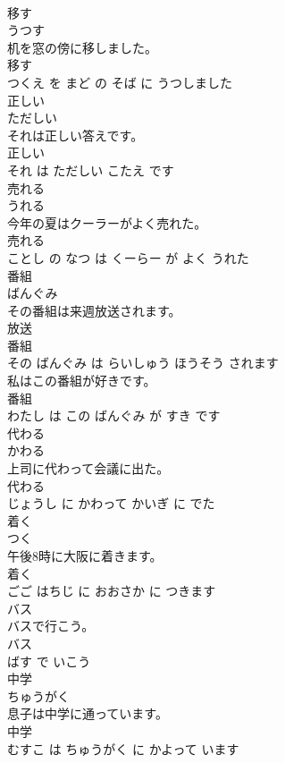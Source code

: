 \documentclass[8pt]{extreport}
\begin{document}
\begin{CJK}{UTF8}{min}
\\	移す	
\\	うつす			
\\	机を窓の傍に移しました。	
\\	移す 
\\	つくえ を まど の そば に うつしました			
\\	正しい	
\\	ただしい			
\\	それは正しい答えです。	
\\	正しい 
\\	それ は ただしい こたえ です			
\\	売れる	
\\	うれる			
\\	今年の夏はクーラーがよく売れた。	
\\	売れる 
\\	ことし の なつ は くーらー が よく うれた			
\\	番組	
\\	ばんぐみ			
\\	その番組は来週放送されます。	
\\	放送 
\\	番組 
\\	その ばんぐみ は らいしゅう ほうそう されます			
\\	私はこの番組が好きです。	
\\	番組 
\\	わたし は この ばんぐみ が すき です			
\\	代わる	
\\	かわる			
\\	上司に代わって会議に出た。	
\\	代わる 
\\	じょうし に かわって かいぎ に でた			
\\	着く	
\\	つく			
\\	午後8時に大阪に着きます。	
\\	着く 
\\	ごご はちじ に おおさか に つきます			
\\	バス	
\\	バスで行こう。	
\\	バス 
\\	ばす で いこう			
\\	中学	
\\	ちゅうがく			
\\	息子は中学に通っています。	
\\	中学 
\\	むすこ は ちゅうがく に かよって います			

\end{CJK}
\end{document}
